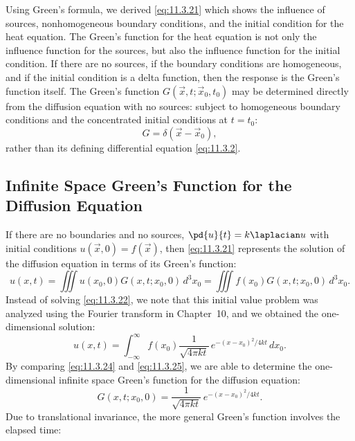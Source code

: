 Using Green's formula, we derived \eqref{eq:11.3.21} which shows the influence of sources, nonhomogeneous boundary conditions, and the initial condition for the heat equation.  The Green's function for the heat equation is not only the influence function for the sources, but also the influence function for the initial condition.  If there are no sources, if the boundary conditions are homogeneous, and if the initial condition is a delta function, then the response is the Green's function itself.  The Green's function $G(\vec{x},t;\vec{x}_0,t_0)$ may be determined directly from the diffusion equation with no sources:
subject to homogeneous boundary conditions and the concentrated initial conditions at $t = t_0$:
\begin{equation}
\label{eq:11.3.23}
G = \delta(\vec{x} - \vec{x}_0),
\end{equation}
rather than its defining differential equation \eqref{eq:11.3.2}.

\subsection{Infinite Space Green's Function for the Diffusion Equation}
\label{subsec:inf-space-greens-heat}

If there are no boundaries and no sources, $\pd{u}{t} = k\laplacian u$ with initial conditions $u(\vec{x},0) = f(\vec{x})$, then \eqref{eq:11.3.21} represents the solution of the diffusion equation in terms of its Green's function:
\begin{equation}
\label{eq:11.3.24}
u(x,t) = \iiint u(x_0,0)G(x,t;x_0,0)\,d^3x_0 = \iiint f(x_0)G(x,t;x_0,0)\,d^3x_0.
\end{equation}
Instead of solving \eqref{eq:11.3.22}, we note that this initial value problem was analyzed using the Fourier transform in Chapter~10, and we obtained the one-dimensional solution:
\begin{equation}
\label{eq:11.3.25}
u(x,t) = \int_{-\infty}^{\infty} f(x_0)\frac{1}{\sqrt{4\pi k t}}\,e^{-(x-x_0)^2/4kt}\,dx_0.
\end{equation}
By comparing \eqref{eq:11.3.24} and \eqref{eq:11.3.25}, we are able to determine the one-dimensional infinite space Green's function for the diffusion equation:
\begin{equation}
\label{eq:11.3.26}
G(x,t;x_0,0) = \frac{1}{\sqrt{4\pi kt}}\,e^{-(x-x_0)^2/4kt}.
\end{equation}
Due to translational invariance, the more general Green's function involves the elapsed time:

